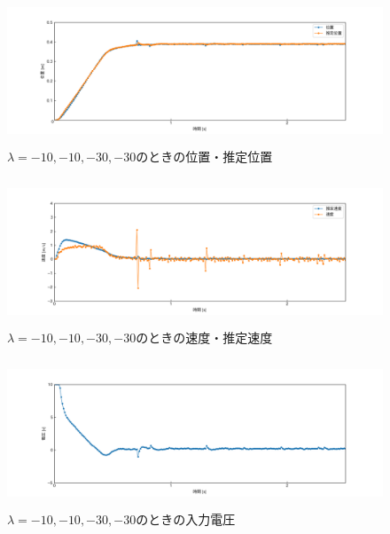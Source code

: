 \documentclass[12pt]{jsarticle}
\begin{document}
\begin{figure}[H]
  \begin{center}
    \includegraphics[clip,width=13.0cm, height=4.4cm]{../img/Exp3-1.png}
    \caption{$\lambda=-10, -10, -30, -30$のときの位置・推定位置}
    \label{Exp3-1}
  \end{center}
\end{figure}
\begin{figure}[H]
  \begin{center}
    \includegraphics[clip,width=13.0cm, height=4.4cm]{../img/Exp3-2.png}
    \caption{$\lambda=-10, -10, -30, -30$のときの速度・推定速度}
    \label{Exp3-2}
  \end{center}
\end{figure}
\begin{figure}[H]
  \begin{center}
    \includegraphics[clip,width=13.0cm, height=4.4cm]{../img/Exp3-3.png}
    \caption{$\lambda=-10, -10, -30, -30$のときの入力電圧}
    \label{Exp3-3}
  \end{center}
\end{figure}
\end{document}
